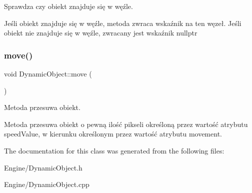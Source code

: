 Sprawdza czy obiekt znajduje się w węźle. 

Jeśli obiekt znajduje się w węźle, metoda zwraca wskaźnik na ten węzeł. Jeśli obiekt nie znajduje się w węźle, zwracany jest wskaźnik nullptr \mbox{\label{classDynamicObject_a9fb1ce835d8c4ffe0a3ffd799067be9a}} 
\subsubsection{\texorpdfstring{move()}{move()}}
{\footnotesize\ttfamily void Dynamic\+Object\+::move (\begin{DoxyParamCaption}{ }\end{DoxyParamCaption})\hspace{0.3cm}{\ttfamily [protected]}}



Metoda przesuwa obiekt. 

Metoda przesuwa obiekt o pewną ilość pikseli określoną przez wartość atrybutu speed\+Value, w kierunku określonym przez wartość atrybutu movement. 

The documentation for this class was generated from the following files\+:\begin{DoxyCompactItemize}
\item 
Engine/Dynamic\+Object.\+h\item 
Engine/Dynamic\+Object.\+cpp\end{DoxyCompactItemize}
